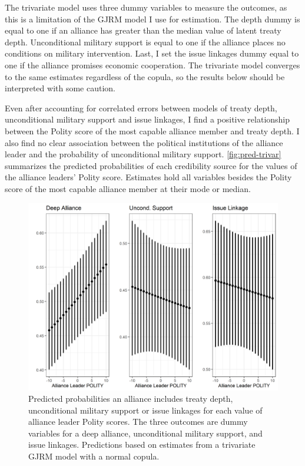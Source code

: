 \documentclass[12pt]{article}
\begin{document}
The trivariate model uses three dummy variables to measure the outcomes, as this is a limitation of the GJRM model I use for estimation. 
The depth dummy is equal to one if an alliance has greater than the median value of latent treaty depth. 
Unconditional military support is equal to one if the alliance places no conditions on military intervention. 
Last, I set the issue linkages dummy equal to one if the alliance promises economic cooperation. 
The trivariate model converges to the same estimates regardless of the copula, so the results below should be interpreted with some caution.


Even after accounting for correlated errors between models of treaty depth, unconditional military support and issue linkages, I find a positive relationship between the Polity score of the most capable alliance member and treaty depth. 
I also find no clear association between the political institutions of the alliance leader and the probability of unconditional military support. 
\autoref{fig:pred-trivar} summarizes the predicted probabilities of each credibility source for the values of the alliance leaders' Polity score. 
Estimates hold all variables besides the Polity score of the most capable alliance member at their mode or median.  


\begin{figure}
\includegraphics[width=.95\textwidth]{pred-trivar.png}  
\caption{Predicted probabilities an alliance includes treaty depth, unconditional military support or issue linkages for each value of alliance leader Polity scores. The three outcomes are dummy variables for a deep alliance, unconditional military support, and issue linkages. Predictions based on estimates from a trivariate GJRM model with a normal copula.}
\label{fig:pred-trivar}
\end{figure}




\newpage

\singlespace
 
 
\end{document}
